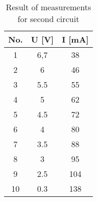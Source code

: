 \begin{table}[hptb]
	\centering
	\caption{Result of measurements for second circuit}
	\label{tab:tab1}
	\begin{tabular}{|c|c|c|}
		\hline
		No. & U [\unit{\volt}] & I [\unit{\milli\ampere}]  \\
		\hline
		1& 6,7 & 38 \\
		\hline
		2& 6 & 46 \\
		\hline
		3& 5.5 & 55 \\
		\hline
		4& 5 & 62 \\
		\hline
        5& 4.5 & 72 \\
		\hline
        6& 4 & 80 \\
		\hline
        7& 3.5 & 88 \\
		\hline
        8& 3 & 95 \\
		\hline
        9& 2.5 & 104 \\
		\hline
        10& 0.3 & 138 \\
		\hline
	\end{tabular}
\end{table}
